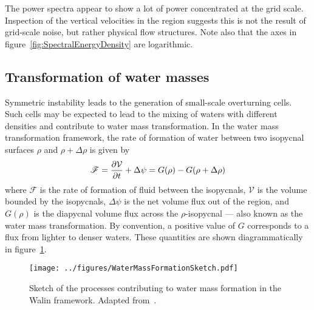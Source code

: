 The power spectra appear to show a lot of power concentrated at the grid scale. Inspection of the vertical velocities in the region suggests this is not the result of grid-scale noise, but rather physical flow structures. Note also that the axes in figure~\ref{fig:SpectralEnergyDensity} are logarithmic.

\subsection{Transformation of water masses}
\label{subsubsec:WaterMassTransformation}
Symmetric instability leads to the generation of small-scale overturning cells. Such cells may be expected to lead to the mixing of waters with different densities and contribute to water mass transformation. In the \citet{Walin1982} water mass transformation framework, the rate of formation of water between two isopycnal surfaces $\rho$ and $\rho + \Delta \rho$ is given by
\begin{equation}
    \mathscr{F} = \pdv{\mathcal{V}}{t} + \Delta \psi = G(\rho) - G(\rho + \Delta \rho)
    \label{eq:WallinFormation}
\end{equation}
where $\mathscr{F}$ is the rate of formation of fluid between the isopycnals, $\mathcal{V}$ is the volume bounded by the isopycnals, $\Delta \psi$ is the net volume flux out of the region, and $G(\rho)$ is the diapycnal volume flux across the $\rho$-isopycnal --- also known as the water mass transformation. By convention, a positive value of $G$ corresponds to a flux from lighter to denser waters. These quantities are shown diagrammatically in figure~\ref{fig:WaterMassFormationSketch}.

\begin{figure} 
    \centering
    \texttt{[image: ../figures/WaterMassFormationSketch.pdf]}
    \caption{Sketch of the processes contributing to water mass formation in the Walin framework. Adapted from~\citet{Williams2011}.}
    \label{fig:WaterMassFormationSketch}
\end{figure}

